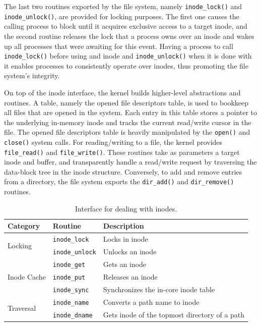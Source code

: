 \documentclass[10pt,a4paper]{article}
\begin{document}
The last two routines exported by the file system, namely \texttt{inode\_lock()} and \texttt{inode\_unlock()}, are provided for locking purposes. The first one causes the calling process to block until it acquires exclusive access to a target inode, and the second routine releases the lock that a process owns over an inode and wakes up all processes that were awaiting for this event. Having a process to call \texttt{inode\_lock()} before using and inode and \texttt{inode\_unlock()} when it is done with it enables processes to consistently operate over inodes, thus promoting the file system's integrity.

On top of the inode interface, the kernel builds higher-level abstractions and routines. A table, namely the opened file descriptors table, is used to bookkeep all files that are opened in the system. Each entry in this table stores a pointer to the underlying in-memory inode and tracks the current read/write cursor in the file. The opened file descriptors table is heavily manipulated by the \texttt{open()} and \texttt{close()} system calls. For reading/writing to a file, the kernel provides \texttt{file\_read()} and \texttt{file\_write()}. These routines take as parameters a target inode and buffer, and transparently handle a read/write request by traversing the data-block tree in the inode structure. Conversely, to add and remove entries from a directory, the file system exports the \texttt{dir\_add()} and \texttt{dir\_remove()} routines. 

\begin{table}
\small
\centering
\caption{Interface for dealing with inodes.}
\label{table: inodes interface}
\begin{tabular}{l l l}
	\toprule
	Category & Routine & Description \\
	\midrule
	\multirow{2}{*}{Locking}
	                               & \texttt{inode\_lock}     & Locks in inode                                \\
	                               & \texttt{inode\_unlock}   & Unlocks an inode                              \\
	\midrule
	\multirow{3}{*}{Inode Cache}
	                               & \texttt{inode\_get}      & Gets an inode                                  \\
	                               & \texttt{inode\_put}      & Releases an inode                              \\
	                               & \texttt{inode\_sync}     & Synchronizes the in-core inode table           \\
	\midrule
	\multirow{2}{*}{Traversal}
	                               & \texttt{inode\_name}     & Converts a path name to inode                  \\
	                               & \texttt{inode\_dname}    & Gets inode of the topmost directory of a path  \\
	\bottomrule
\end{tabular}
\end{table}

\printbibliography
\end{document}
